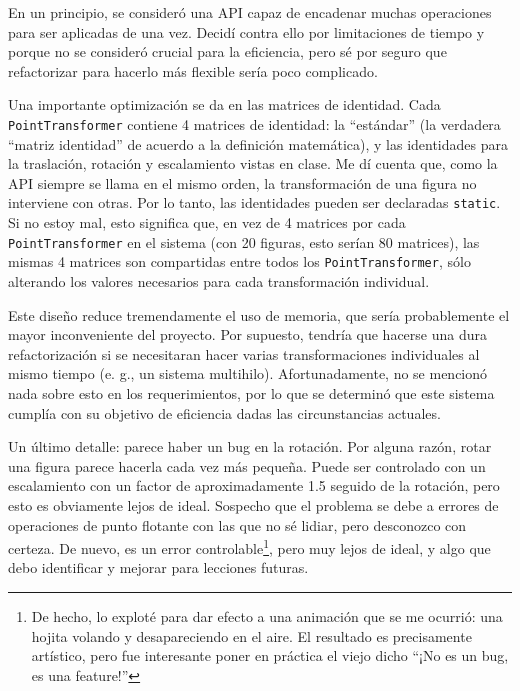 En un principio, se consideró una API capaz de encadenar muchas operaciones para ser
aplicadas de una vez. Decidí contra ello por limitaciones de tiempo y porque no se
consideró crucial para la eficiencia, pero sé por
seguro que refactorizar para hacerlo más flexible sería poco complicado.

Una importante optimización se da en las matrices de identidad. Cada \lstinline!PointTransformer!
contiene 4 matrices de identidad: la ``estándar'' (la verdadera
``matriz identidad'' de acuerdo a la definición matemática), y las identidades para
la traslación, rotación	y escalamiento vistas en clase. Me dí cuenta que, como la
API siempre se llama en el mismo orden, la transformación de una figura no interviene
con otras. Por lo tanto, las identidades pueden ser declaradas \lstinline!static!.
Si no estoy mal, esto significa que, en vez de 4 matrices por cada \lstinline!PointTransformer!
en el sistema (con 20 figuras, esto serían 80 matrices), las mismas 4 matrices
son compartidas entre todos los \lstinline!PointTransformer!, sólo alterando
los valores necesarios para cada transformación individual.

Este diseño reduce tremendamente el uso de memoria, que sería probablemente el
mayor inconveniente del proyecto. Por supuesto, tendría que hacerse una dura refactorización
si se necesitaran hacer varias transformaciones individuales al mismo tiempo (e. g.,
un sistema multihilo). Afortunadamente, no se mencionó nada sobre esto en los requerimientos,
por lo que se determinó que este sistema cumplía con su objetivo de eficiencia dadas
las circunstancias actuales.

Un último detalle: parece haber un bug en la rotación. Por alguna razón, rotar una figura
parece hacerla cada vez más pequeña. Puede ser controlado con un escalamiento con
un factor de aproximadamente 1.5 seguido de la rotación, pero esto es obviamente lejos
de ideal. Sospecho que el problema se debe a errores de operaciones de punto flotante
con las que no sé lidiar, pero desconozco con certeza. De nuevo, es un error controlable\footnote{De
hecho, lo exploté para dar efecto a una animación que se me ocurrió: una hojita volando
y desapareciendo en el aire. El resultado es precisamente artístico, pero fue interesante
poner en práctica el viejo dicho ``¡No es un bug, es una feature!''},
pero muy lejos de ideal, y algo que debo identificar y mejorar para lecciones futuras.